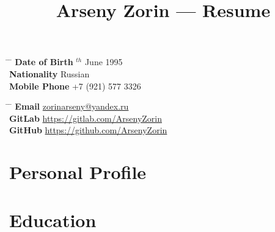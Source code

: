 \documentclass[10pt]{article} %
\begin{document}

\title{Arseny Zorin --- Resume} %


\parbox{0.5\textwidth}{ %
\begin{tabbing} %
\hspace{3cm} \= \hspace{4cm} \= \kill %
{\bf Date of Birth} $^{th}$ June 1995 \\ %
{\bf Nationality} \> Russian \\ %
{\bf Mobile Phone} \> +7 (921) 577 3326 \\ %
\end{tabbing}}
\hfill %
\parbox{0.5\textwidth}{ %
\begin{tabbing} %
\hspace{3cm} \= \hspace{4cm} \= \kill %
{\bf Email} \> \href{mailto:zorinarseny@yandex.ru}{zorinarseny@yandex.ru} \\ %
{\bf GitLab} \> \href{https://gitlab.com/ArsenyZorin}{https://gitlab.com/ArsenyZorin} \\ %
{\bf GitHub} \> \href{https://github.com/ArsenyZorin}{https://github.com/ArsenyZorin} \\ %
\end{tabbing}}


\section{Personal Profile}


\section{Education}
\end{document}
